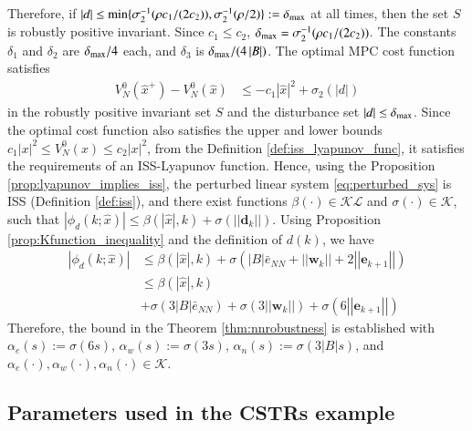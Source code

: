 \documentclass[preprint,5p, twocolumn, authoryear]{elsarticle}
\newcommand{\norm}[1]{\left| #1 \right|}
\newcommand{\xhat}{\hat{x}}
\begin{document}
Therefore, if $\norm{d} \leq \textnormal{min} \{ \sigma_2^{-1}(\rho c_1/(2c_2)),
\sigma_2^{-1}(\rho/2)\} := \delta_{\textnormal{max}}$ at all times, then the set
$S$ is robustly positive invariant. Since $c_1 \leq c_2$,
$\delta_{\textnormal{max}} = \sigma_2^{-1}(\rho c_1/(2c_2))$. The constants
$\delta_1$ and $\delta_2$ are $\delta_{\textnormal{max}}/4$ each, and $\delta_3$
is $\delta_{\textnormal{max}}/(4\norm{B})$. The optimal MPC cost function
satisfies
\begin{align*}
    V_N^0(\xhat^+) - V_N^0(\xhat) &\leq 
    -c_1\norm{\xhat}^2 + \sigma_2(\norm{d})
\end{align*}
in the robustly positive invariant set $S$ and the disturbance set $\norm{d}
\leq \delta_{\textnormal{max}}$. Since the optimal cost function also satisfies
the upper and lower bounds $c_1\norm{x}^2 \leq V_N^0(x) \leq c_2\norm{x}^2$,
from the Definition \ref{def:iss_lyapunov_func}, it satisfies the requirements
of an ISS-Lyapunov function. Hence, using the Proposition
\ref{prop:lyapunov_implies_iss}, the perturbed linear system
\eqref{eq:perturbed_sys} is ISS (Definition \ref{def:iss}), and there exist
functions $\beta(\cdot) \in \mathcal{K}\mathcal{L}$ and $\sigma(\cdot) \in
\mathcal{K}$, such that $\norm{\phi_d(k; \xhat)} \leq \beta(\norm{\xhat}, k) +
\sigma(\norm{\norm{\mathbf{d}_k}})$. Using Proposition
\ref{prop:Kfunction_inequality} and the definition of $d(k)$, we have 
\begin{align*}
    \norm{\phi_d(k; \xhat)} & \leq \beta(\norm{\xhat}, k)
    + \sigma(\norm{B}\bar{e}_{NN} + \norm{\norm{\mathbf{w}_k}}
    + 2\norm{\norm{\mathbf{e}_{k+1}}}) \\
     & \leq \beta(\norm{\xhat}, k) \\
    & +\sigma(3\norm{B}\bar{e}_{NN}) + 
    \sigma(3\norm{\norm{\mathbf{w}_k}})
    + \sigma(6\norm{\norm{\mathbf{e}_{k+1}}})
\end{align*}
Therefore, the bound in the Theorem \ref{thm:nnrobustness} is established with
$\alpha_e(s) := \sigma(6s)$, $\alpha_w(s) := \sigma(3s)$, $\alpha_n(s) :=
\sigma(3\norm{B} s)$, and $\alpha_e(\cdot), \alpha_w(\cdot), \alpha_n(\cdot) \in
\mathcal{K}$.

\subsection{Parameters used in the CSTRs example} \label{app:cstrs_pars}
\end{document}
